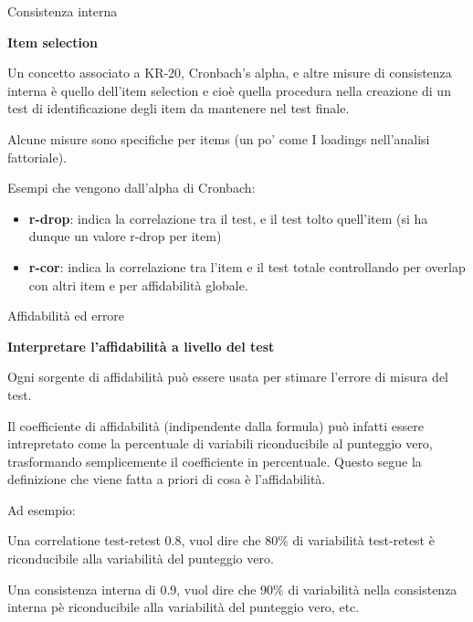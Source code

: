 \documentclass[
  ignorenonframetext,
]{beamer}
\begin{document}
\begin{frame}{Consistenza interna}
\label{consistenza-interna-5}
\begin{center}
  \textbf{Item selection}
\end{center}

\small

Un concetto associato a KR-20, Cronbach's alpha, e altre misure di
consistenza interna è quello dell'item selection e cioè quella procedura
nella creazione di un test di identificazione degli item da mantenere
nel test finale.

Alcune misure sono specifiche per items (un po' come I loadings
nell'analisi fattoriale).

Esempi che vengono dall'alpha di Cronbach:

\begin{itemize}
\item
  \textbf{r-drop}: indica la correlazione tra il test, e il test tolto
  quell'item (si ha dunque un valore r-drop per item)
\item
  \textbf{r-cor}: indica la correlazione tra l'item e il test totale
  controllando per overlap con altri item e per affidabilità globale.
\end{itemize}
\end{frame}

\begin{frame}{Affidabilità ed errore}
\label{affidabilituxe0-ed-errore}
\begin{center}
  \textbf{Interpretare l'affidabilità a livello del test}
\end{center}

\small

Ogni sorgente di affidabilità può essere usata per stimare l'errore di
misura del test.

Il coefficiente di affidabilità (indipendente dalla formula) può infatti
essere intrepretato come la percentuale di variabili riconducibile al
punteggio vero, trasformando semplicemente il coefficiente in
percentuale. Questo segue la definizione che viene fatta a priori di
cosa è l'affidabilità.

Ad esempio:

Una correlatione test-retest 0.8, vuol dire che 80\% di variabilità
test-retest è riconducibile alla variabilità del punteggio vero.

Una consistenza interna di 0.9, vuol dire che 90\% di variabilità nella
consistenza interna pè riconducibile alla variabilità del punteggio
vero, etc.
\end{frame}
\end{document}
